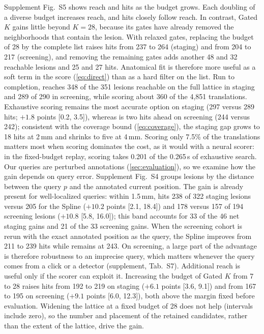 Supplement Fig.~S5 shows reach and hits as the budget grows.
Each doubling of a diverse budget increases reach, and hits closely follow reach.
In contrast, Gated $K$ gains little beyond $K{=}28$, because its gates have already removed the neighborhoods that contain the lesion.
With relaxed gates, replacing the budget of 28 by the complete list raises hits from 237 to 264 (staging) and from 204 to 217 (screening), and removing the remaining gates adds another 48 and 32 reachable lesions and 25 and 27 hits.
Anatomical fit is therefore more useful as a soft term in the score (\cref{eq:direct}) than as a hard filter on the list.
Run to completion, \ours reaches 348 of the 351 lesions reachable on the full lattice in staging and 289 of 290 in screening, while scoring about 360 of the 4,851 translations.
Exhaustive scoring remains the most accurate option on staging (297 versus 289 hits; $+1.8$ points [0.2, 3.5]), whereas \ours is two hits ahead on screening (244 versus 242); consistent with the coverage bound (\cref{eq:coverage}), the staging gap grows to 18 hits at 2\,mm and shrinks to five at 4\,mm.
Scoring only 7.5\% of the translations matters most when scoring dominates the cost, as it would with a neural scorer: in the fixed-budget replay, scoring takes 0.201 of the 0.265\,s of exhaustive search.
\label{sec:query}
Our queries are perturbed annotations (\cref{sec:evaluation}), so we examine how the gain depends on query error.
Supplement Fig.~S4 groups lesions by the distance between the query $p$ and the annotated current position.
The gain is already present for well-localized queries: within 1.5\,mm, \ours hits 238 of 322 staging lesions versus 205 for the Spline ($+10.2$ points [2.1, 18.4]) and 178 versus 157 of 194 screening lesions ($+10.8$ [5.8, 16.0]); this band accounts for 33 of the 46 net staging gains and 21 of the 33 screening gains.
When the screening cohort is rerun with the exact annotated position as the query, the Spline improves from 211 to 239 hits while \ours remains at 243.
On screening, a large part of the advantage is therefore robustness to an imprecise query, which matters whenever the query comes from a click or a detector (supplement, Tab.~S7). Additional reach is useful only if the scorer can exploit it.
Increasing the budget of Gated $K$ from 7 to 28 raises hits from 192 to 219 on staging ($+6.1$ points [3.6, 9.1]) and from 167 to 195 on screening ($+9.1$ points [6.0, 12.3]), both above the margin fixed before evaluation.
Widening the lattice at a fixed budget of 28 does not help (intervals include zero), so the number and placement of the retained candidates, rather than the extent of the lattice, drive the gain.
